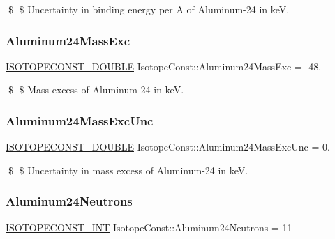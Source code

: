 \$ \$ Uncertainty in binding energy per A of Aluminum-\/24 in keV. \mbox{\label{group___isotope_const-_aluminum-_al24_gad2b37d71345ce8f2ff16771efb6df5b9}} 
\subsubsection{\texorpdfstring{Aluminum24\+Mass\+Exc}{Aluminum24MassExc}}
{\footnotesize\ttfamily \mbox{\hyperlink{group___isotope_const-_macros_ga8f45a7272ce02c0b4c65c44636ed719a}{I\+S\+O\+T\+O\+P\+E\+C\+O\+N\+S\+T\+\_\+\+D\+O\+U\+B\+LE}} Isotope\+Const\+::\+Aluminum24\+Mass\+Exc = -\/48.}

\$ \$ Mass excess of Aluminum-\/24 in keV. \mbox{\label{group___isotope_const-_aluminum-_al24_ga517869d87dd5139208cc9693c9b0df89}} 
\subsubsection{\texorpdfstring{Aluminum24\+Mass\+Exc\+Unc}{Aluminum24MassExcUnc}}
{\footnotesize\ttfamily \mbox{\hyperlink{group___isotope_const-_macros_ga8f45a7272ce02c0b4c65c44636ed719a}{I\+S\+O\+T\+O\+P\+E\+C\+O\+N\+S\+T\+\_\+\+D\+O\+U\+B\+LE}} Isotope\+Const\+::\+Aluminum24\+Mass\+Exc\+Unc = 0.}

\$ \$ Uncertainty in mass excess of Aluminum-\/24 in keV. \mbox{\label{group___isotope_const-_aluminum-_al24_ga7f2fe0ffbcb0fd95f069a066ea002090}} 
\subsubsection{\texorpdfstring{Aluminum24\+Neutrons}{Aluminum24Neutrons}}
{\footnotesize\ttfamily \mbox{\hyperlink{group___isotope_const-_macros_ga5f18360b3e99483a35c32d789e62621c}{I\+S\+O\+T\+O\+P\+E\+C\+O\+N\+S\+T\+\_\+\+I\+NT}} Isotope\+Const\+::\+Aluminum24\+Neutrons = 11}

